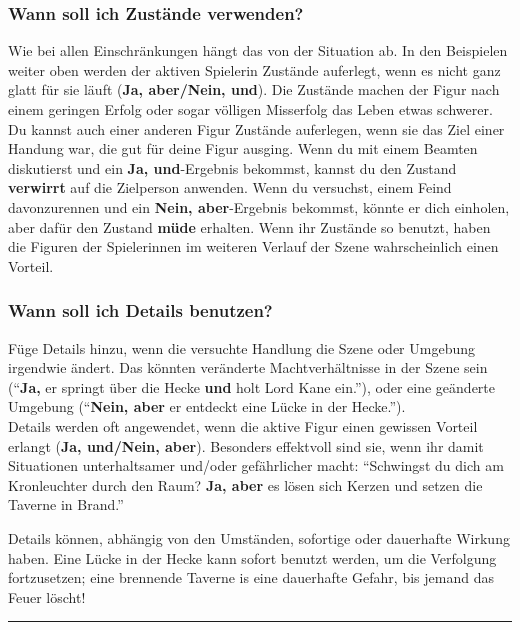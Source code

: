 \documentclass[]{article}
\begin{document}
\subsubsection{Wann soll ich Zustände
verwenden?}\label{wann-soll-ich-zustuxe4nde-verwenden}

Wie bei allen Einschränkungen hängt das von der Situation ab. In den
Beispielen weiter oben werden der aktiven Spielerin Zustände auferlegt,
wenn es nicht ganz glatt für sie läuft (\textbf{Ja, aber/Nein, und}).
Die Zustände machen der Figur nach einem geringen Erfolg oder sogar
völligen Misserfolg das Leben etwas schwerer. Du kannst auch einer
anderen Figur Zustände auferlegen, wenn sie das Ziel einer Handung war,
die gut für deine Figur ausging. Wenn du mit einem Beamten diskutierst
und ein \textbf{Ja, und}-Ergebnis bekommst, kannst du den Zustand
\textbf{verwirrt} auf die Zielperson anwenden. Wenn du versuchst, einem
Feind davonzurennen und ein \textbf{Nein, aber}-Ergebnis bekommst,
könnte er dich einholen, aber dafür den Zustand \textbf{müde} erhalten.
Wenn ihr Zustände so benutzt, haben die Figuren der Spielerinnen im
weiteren Verlauf der Szene wahrscheinlich einen Vorteil.

\subsubsection{Wann soll ich Details
benutzen?}\label{wann-soll-ich-details-benutzen}

Füge Details hinzu, wenn die versuchte Handlung die Szene oder Umgebung
irgendwie ändert. Das könnten veränderte Machtverhältnisse in der Szene
sein (``\textbf{Ja,} er springt über die Hecke \textbf{und} holt Lord
Kane ein.''), oder eine geänderte Umgebung (``\textbf{Nein, aber} er
entdeckt eine Lücke in der Hecke.'').\\
Details werden oft angewendet, wenn die aktive Figur einen gewissen
Vorteil erlangt (\textbf{Ja, und/Nein, aber}). Besonders effektvoll sind
sie, wenn ihr damit Situationen unterhaltsamer und/oder gefährlicher
macht: ``Schwingst du dich am Kronleuchter durch den Raum? \textbf{Ja,
aber} es lösen sich Kerzen und setzen die Taverne in Brand.''

Details können, abhängig von den Umständen, sofortige oder dauerhafte
Wirkung haben. Eine Lücke in der Hecke kann sofort benutzt werden, um
die Verfolgung fortzusetzen; eine brennende Taverne is eine dauerhafte
Gefahr, bis jemand das Feuer löscht!

\begin{center}\rule{0.5\linewidth}{\linethickness}\end{center}
\end{document}
